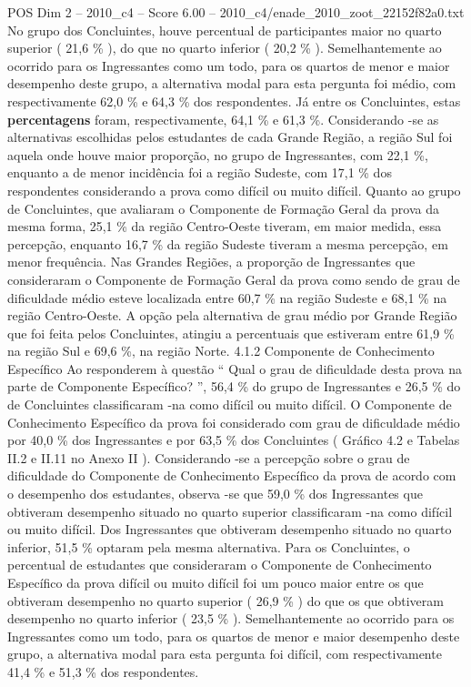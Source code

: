 \begin{textsample}{POS Dim 2 – 2010\_c4 – Score 6.00 – 2010\_c4/enade\_2010\_zoot\_22152f82a0.txt}
No grupo dos Concluintes, houve percentual de participantes maior no quarto superior ( 21,6 \% ), do que no quarto inferior ( 20,2 \% ).
Semelhantemente ao ocorrido para os Ingressantes como um todo, para os quartos de menor e maior desempenho deste grupo, a alternativa modal para esta pergunta foi médio, com respectivamente 62,0 \% e 64,3 \% dos respondentes.
Já entre os Concluintes, estas \textbf{percentagens} foram, respectivamente, 64,1 \% e 61,3 \%.
Considerando -se as alternativas escolhidas pelos estudantes de cada Grande Região, a região Sul foi aquela onde houve maior proporção, no grupo de Ingressantes, com 22,1 \%, enquanto a de menor incidência foi a região Sudeste, com 17,1 \% dos respondentes considerando a prova como difícil ou muito difícil.
Quanto ao grupo de Concluintes, que avaliaram o Componente de Formação Geral da prova da mesma forma, 25,1 \% da região Centro-Oeste tiveram, em maior medida, essa percepção, enquanto 16,7 \% da região Sudeste tiveram a mesma percepção, em menor frequência.
Nas Grandes Regiões, a proporção de Ingressantes que consideraram o Componente de Formação Geral da prova como sendo de grau de dificuldade médio esteve localizada entre 60,7 \% na região Sudeste e 68,1 \% na região Centro-Oeste.
A opção pela alternativa de grau médio por Grande Região que foi feita pelos Concluintes, atingiu a percentuais que estiveram entre 61,9 \% na região Sul e 69,6 \%, na região Norte. 4.1.2 Componente de Conhecimento Específico Ao responderem à questão “ Qual o grau de dificuldade desta prova na parte de Componente Específico? ”, 56,4 \% do grupo de Ingressantes e 26,5 \% do de Concluintes classificaram -na como difícil ou muito difícil.
O Componente de Conhecimento Específico da prova foi considerado com grau de dificuldade médio por 40,0 \% dos Ingressantes e por 63,5 \% dos Concluintes ( Gráfico 4.2 e Tabelas II.2 e II.11 no Anexo II ).
Considerando -se a percepção sobre o grau de dificuldade do Componente de Conhecimento Específico da prova de acordo com o desempenho dos estudantes, observa -se que 59,0 \% dos Ingressantes que obtiveram desempenho situado no quarto superior classificaram -na como difícil ou muito difícil.
Dos Ingressantes que obtiveram desempenho situado no quarto inferior, 51,5 \% optaram pela mesma alternativa.
Para os Concluintes, o percentual de estudantes que consideraram o Componente de Conhecimento Específico da prova difícil ou muito difícil foi um pouco maior entre os que obtiveram desempenho no quarto superior ( 26,9 \% ) do que os que obtiveram desempenho no quarto inferior ( 23,5 \% ).
Semelhantemente ao ocorrido para os Ingressantes como um todo, para os quartos de menor e maior desempenho deste grupo, a alternativa modal para esta pergunta foi difícil, com respectivamente 41,4 \% e 51,3 \% dos respondentes.

\end{textsample}
